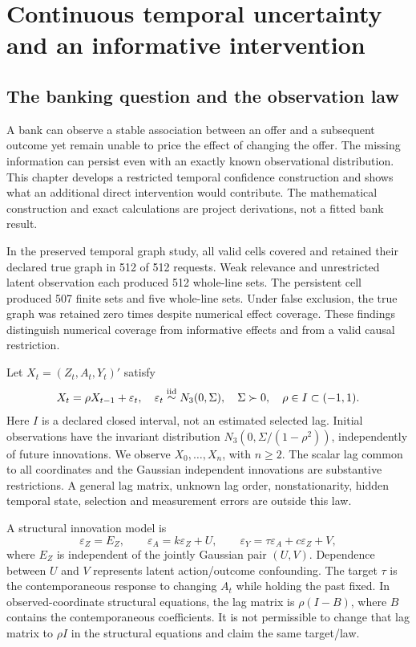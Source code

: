 \chapter{Continuous temporal uncertainty and an informative intervention}
\label{exec13:temporal-region}

\hypertarget{the-banking-question-and-the-observation-law}{%
\section{The banking question and the observation
law}\label{the-banking-question-and-the-observation-law}}

A bank can observe a stable association between an offer and a
subsequent outcome yet remain unable to price the effect of changing the
offer. The missing information can persist even with an exactly known
observational distribution. This chapter develops a restricted temporal
confidence construction and shows what an additional direct intervention
would contribute. The mathematical construction and exact calculations
are project derivations, not a fitted bank result.
\citep{exec13_temporal_argument,exec13_temporal_exact}

In the preserved temporal graph study, all valid cells covered and
retained their declared true graph in 512 of 512 requests. Weak
relevance and unrestricted latent observation each produced 512
whole-line sets. The persistent cell produced 507 finite sets and five
whole-line sets. Under false exclusion, the true graph was retained zero
times despite numerical effect coverage. These findings distinguish
numerical coverage from informative effects and from a valid causal
restriction. \citep{exec13_temporal_predecessor}

Let \(X_t=(Z_t,A_t,Y_t)'\) satisfy \[
 X_t=\rho X_{t-1}+\varepsilon_t,\quad
 \varepsilon_t\mathrel{\mathop\sim^{\rm iid}}N_3(0,\Sigma),\quad
 \Sigma\succ0,\quad \rho\in I\subset(-1,1).
\] Here \(I\) is a declared closed interval, not an estimated selected
lag. Initial observations have the invariant distribution
\(N_3(0,\Sigma/(1-\rho^2))\), independently of future innovations. We
observe \(X_0,\ldots,X_n\), with \(n\ge2\). The scalar lag common to all
coordinates and the Gaussian independent innovations are substantive
restrictions. A general lag matrix, unknown lag order, nonstationarity,
hidden temporal state, selection and measurement errors are outside this
law.

A structural innovation model is \[
 \varepsilon_Z=E_Z,\qquad
 \varepsilon_A=k\varepsilon_Z+U,\qquad
 \varepsilon_Y=\tau\varepsilon_A+c\varepsilon_Z+V,
\] where \(E_Z\) is independent of the jointly Gaussian pair \((U,V)\).
Dependence between \(U\) and \(V\) represents latent action/outcome
confounding. The target \(\tau\) is the contemporaneous response to
changing \(A_t\) while holding the past fixed. In observed-coordinate
structural equations, the lag matrix is \(\rho(I-B)\), where \(B\)
contains the contemporaneous coefficients. It is not permissible to
change that lag matrix to \(\rho I\) in the structural equations and
claim the same target/law.

